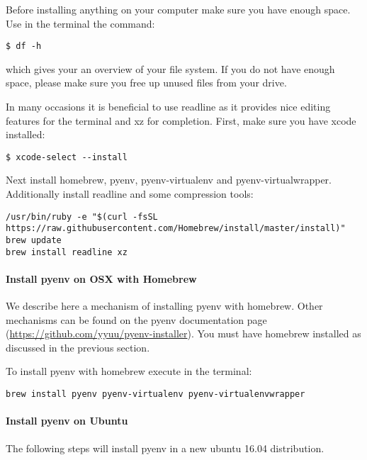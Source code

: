 Before installing anything on your computer make sure you have enough
space. Use in the terminal the command:

\begin{verbatim}
$ df -h
\end{verbatim}

which gives your an overview of your file system. If you do not have
enough space, please make sure you free up unused files from your drive.

In many occasions it is beneficial to use readline as it provides nice
editing features for the terminal and xz for completion. First, make
sure you have xcode installed:

\begin{verbatim}
$ xcode-select --install
\end{verbatim}

Next install homebrew, pyenv, pyenv-virtualenv and pyenv-virtualwrapper.
Additionally install readline and some compression tools:

\begin{verbatim}
/usr/bin/ruby -e "$(curl -fsSL https://raw.githubusercontent.com/Homebrew/install/master/install)"
brew update
brew install readline xz
\end{verbatim}

\paragraph{Install pyenv on OSX with
Homebrew}\label{install-pyenv-on-osx-with-homebrew}

We describe here a mechanism of installing pyenv with homebrew. Other
mechanisms can be found on the pyenv documentation page
(\url{https://github.com/yyuu/pyenv-installer}). You must have homebrew
installed as discussed in the previous section.

To install pyenv with homebrew execute in the terminal:

\begin{verbatim}
brew install pyenv pyenv-virtualenv pyenv-virtualenvwrapper
\end{verbatim}

\paragraph{Install pyenv on Ubuntu}\label{install-pyenv-on-ubuntu}

The following steps will install pyenv in a new ubuntu 16.04
distribution.

